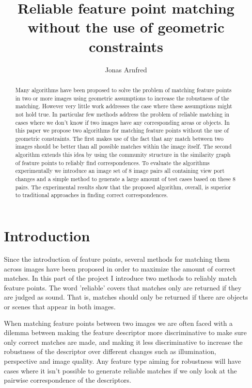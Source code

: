 \documentclass{article}
\begin{document}
\title{Reliable feature point matching without the use of geometric 
constraints}
\author{Jonas Arnfred}

\maketitle

\begin{abstract}
Many algorithms have been proposed to solve the problem of matching 
feature points in two or more images using geometric assumptions to 
increase the robustness of the matching. However very little work 
addresses the case where these assumptions might not hold true. In 
particular few methods address the problem of reliable matching in cases 
where we don't know if two images have any corresponding areas or 
objects. In this paper we propose two algorithms for matching feature 
points without the use of geometric constraints. The first makes use of 
the fact that any match between two images should be better than all 
possible matches within the image itself. The second algorithm extends 
this idea by using the community structure in the similarity graph of 
feature points to reliably find correspondences. To evaluate the 
algorithms experimentally we introduce an image set of 8 image pairs all 
containing view port changes and a simple method to generate a large 
amount of test cases based on these 8 pairs. The experimental results 
show that the proposed algorithm, overall, is superior to traditional 
approaches in finding correct correspondences.
\end{abstract}

\section{Introduction}

Since the introduction of feature points, several methods for matching 
them across images have been proposed in order to maximize the amount of 
correct matches. In this part of the project I introduce two methods to 
reliably match feature points. The word 'reliable' covers that matches 
only are returned if they are judged as sound. That is, matches should 
only be returned if there are objects or scenes that appear in both 
images.

When matching feature points between two images we are often faced with 
a dilemma between making the feature descriptor more discriminative to 
make sure only correct matches are made, and making it less 
discriminative to increase the robustness of the descriptor over 
different changes such as illumination, perspective and image quality.  
Any feature type aiming for robustness will have cases where it isn't 
possible to generate reliable matches if we only look at the pairwise 
correspondence of the descriptors. 
\end{document}
